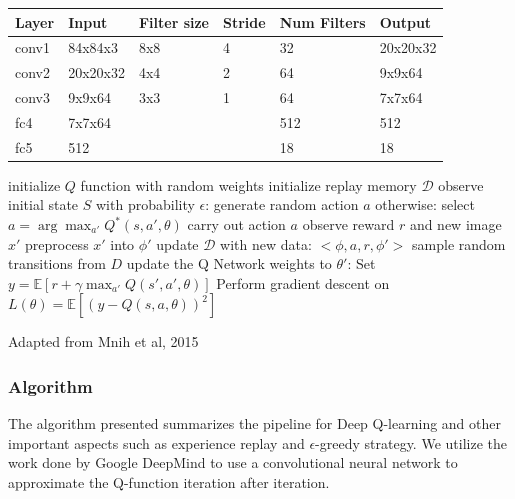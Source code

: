 \documentclass{article}
\begin{document}
\begin{multicols}{2}
\begin{minipage}{\columnwidth}
{
\centering
\begin{tabu} to 0.9\columnwidth {X[0.6]X[1.2]XX[0.6]XX[1.2]}
    \hline
    Layer & Input    & Filter size & Stride & Num Filters & Output   \\[9pt] \hline
    conv1 & 84x84x3  & 8x8         & 4      & 32          & 20x20x32 \\ \hline
    conv2 & 20x20x32 & 4x4         & 2      & 64          & 9x9x64   \\ \hline
    conv3 & 9x9x64   & 3x3         & 1      & 64          & 7x7x64   \\ \hline
    fc4   & 7x7x64   &             &        & 512         & 512      \\ \hline
    fc5   & 512      &             &        & 18          & 18     \\ \hline
\end{tabu}
}
\end{minipage}


\begin{algorithm*}[H]
     \SetAlgoLined
     initialize $Q$ function with random weights \;
     initialize replay memory $\mathcal{D}$ \;
      {
     observe initial state $S$ \;
         {
        \DontPrintSemicolon with probability $\epsilon$: \;
        \PrintSemicolon \Indp generate random action $a$ \;
        \DontPrintSemicolon \Indm otherwise: \;
        \PrintSemicolon \Indp select $a = \arg\max_{a'} Q^*(s,a',\theta)$ \;
        \Indm
        carry out action $a$ \;
        observe reward $r$ and new image $x'$ \;
        preprocess $x'$ into $\phi'$ \;
        update $\mathcal{D}$ with new data: $<\phi,a,r,\phi'>$ \;
        sample random transitions from $D$ \;
        update the Q Network weights to $\theta'$: \;
        \Indp
        Set $y = \mathbb{E}[r + \gamma\max_{a'}Q(s',a',\theta)] $\;
        Perform gradient descent on $L(\theta) = \mathbb{E}[(y - Q(s,a,\theta))^2]$  \;
        }
     }
     \caption{Adapted from Mnih et al, 2015}
\end{algorithm*}

\subsubsection{Algorithm}
The algorithm presented summarizes the pipeline for Deep Q-learning and other important aspects such as experience replay and $\epsilon$-greedy strategy. 
We utilize the work done by Google DeepMind to use a convolutional neural network to approximate the Q-function iteration after iteration.



\end{multicols}
\end{document}
